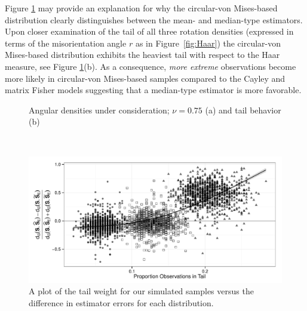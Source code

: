 \noindent Figure \ref{fig:dendetail} may provide an explanation for why the circular-von Mises-based distribution clearly distinguishes between the mean- and median-type estimators.  Upon closer examination of the tail of all three rotation densities (expressed in terms of the misorientation angle $r$ as in Figure~\ref{fig:Haar}) the circular-von Mises-based distribution exhibits the heaviest tail with respect to the Haar measure, see Figure \ref{fig:dendetail}(b). As a consequence, \textit{more extreme} observations become more likely in circular-von Mises-based samples compared to the Cayley and matrix Fisher models suggesting that a median-type estimator is more favorable. 
\begin{figure}[h!]
\centering
{}
\caption{Angular densities under consideration; $\nu=0.75$ (a) and tail behavior (b) }
\label{fig:dendetail}
\end{figure}

\\

\begin{figure}[h!]
\centering
\includegraphics[width=.8\textwidth]{Nu75N300TailBehaviorStandard}
\caption{A plot of the tail weight for our simulated samples versus the difference in estimator errors for each distribution.}
\label{fig:SimTail}
\end{figure}

